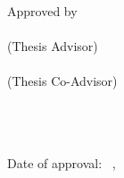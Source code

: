 \clearpage
\thispagestyle{empty}

\begin{center}
	\MakeUppercase{\textbf{\thesistitle}} \\
\end{center}

\vfill
{Approved by} \\
[3\baselineskip]

\advisor \dotfill \\
(Thesis Advisor) \\[\baselineskip]

\coadvisor \dotfill \\
(Thesis Co-Advisor) \\[\baselineskip]

\domjurya \dotfill \\[2\baselineskip]
\domjuryb \dotfill \\[2\baselineskip]
\domjuryc \dotfill \\[2\baselineskip]

\vfill

Date of approval:  \month~\day,~\year

\clearpage
